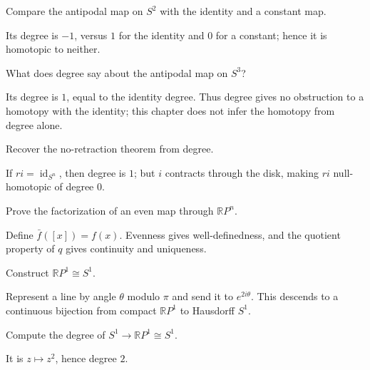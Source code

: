 \begin{problem}[Antipodal \(S^2\)]\label{prob:viii04-06}
Compare the antipodal map on \(S^2\) with the identity and a constant map.
\end{problem}
\begin{solution}
Its degree is \(-1\), versus \(1\) for the identity and \(0\) for a constant; hence it is homotopic to neither.
\end{solution}

\begin{problem}[Antipodal \(S^3\)]\label{prob:viii04-07}
What does degree say about the antipodal map on \(S^3\)?
\end{problem}
\begin{solution}
Its degree is \(1\), equal to the identity degree.  Thus degree gives no obstruction to a homotopy with the identity; this chapter does not infer the homotopy from degree alone.
\end{solution}

\begin{problem}[No retraction]\label{prob:viii04-08}
Recover the no-retraction theorem from degree.
\end{problem}
\begin{solution}
If \(ri=\operatorname{id}_{S^n}\), then degree is \(1\); but \(i\) contracts through the disk, making \(ri\) null-homotopic of degree \(0\).
\end{solution}

\begin{problem}\label{prob:viii04-09}
Prove the factorization of an even map through \(\mathbb RP^n\).
\end{problem}
\begin{solution}
Define \(\bar f([x])=f(x)\). Evenness gives well-definedness, and the quotient property of \(q\) gives continuity and uniqueness.
\end{solution}

\begin{problem}\label{prob:viii04-10}
Construct \(\mathbb RP^1\cong S^1\).
\end{problem}
\begin{solution}
Represent a line by angle \(\theta\) modulo \(\pi\) and send it to \(e^{2i\theta}\). This descends to a continuous bijection from compact \(\mathbb RP^1\) to Hausdorff \(S^1\).
\end{solution}

\begin{problem}\label{prob:viii04-11}
Compute the degree of \(S^1\to\mathbb RP^1\cong S^1\).
\end{problem}
\begin{solution}
It is \(z\mapsto z^2\), hence degree \(2\).
\end{solution}

